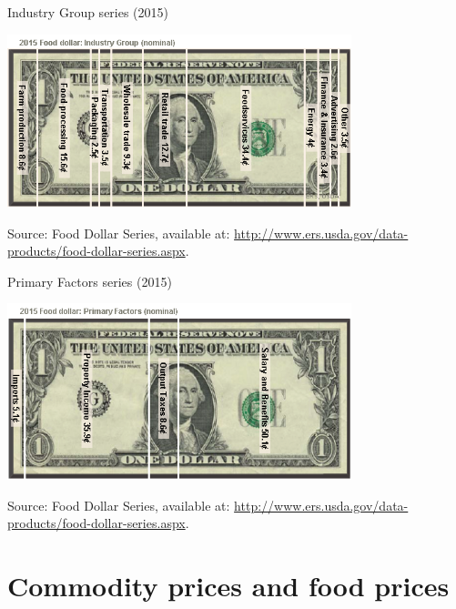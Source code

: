 \documentclass[table,xcolor=pdftex,dvipsnames, handout]{beamer}\usepackage[]{graphicx}\usepackage[]{color}
\begin{document}
\begin{frame}{Industry Group series (2015)}
    \begin{center}
        \includegraphics[width=0.75\textwidth,height=\textheight,keepaspectratio]{industry_group.png}
    \end{center}
    \vspace{-1\baselineskip}
\scriptsize
Source:  Food Dollar Series, available at: \url{http://www.ers.usda.gov/data-products/food-dollar-series.aspx}.
\end{frame}


\begin{frame}{Primary Factors series (2015)}
    \begin{center}
        \includegraphics[width=0.75\textwidth,height=\textheight,keepaspectratio]{primary_factors.png}
    \end{center}
    \vspace{-1\baselineskip}
\scriptsize
Source:  Food Dollar Series, available at: \url{http://www.ers.usda.gov/data-products/food-dollar-series.aspx}.
\end{frame}


\section{Commodity prices and food prices}
\end{document}
